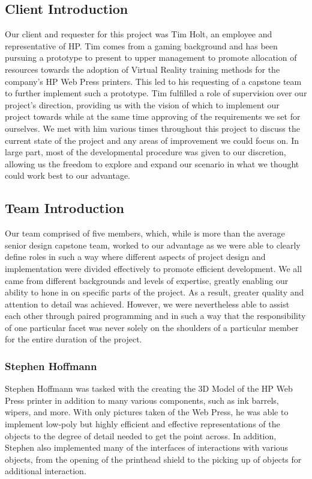 \documentclass[onecolumn, draftclsnofoot,10pt, compsoc]{IEEEtran}
\begin{document}
\subsection{Client Introduction}
Our client and requester for this project was Tim Holt, an employee and representative of HP. Tim comes from a gaming background and has been pursuing a prototype to present to upper management to promote allocation of resources towards the adoption of Virtual Reality training methods for the company's HP Web Press printers. This led to his requesting of a capstone team to further implement such a prototype. Tim fulfilled a role of supervision over our project's direction, providing us with the vision of which to implement our project towards while at the same time approving of the requirements we set for ourselves. We met with him various times throughout this project to discuss the current state of the project and any areas of improvement we could focus on. In large part, most of the developmental procedure was given to our discretion, allowing us the freedom to explore and expand our scenario in what we thought could work best to our advantage. 

\subsection{Team Introduction}
Our team comprised of five members, which, while is more than the average senior design capstone team, worked to our advantage as we were able to clearly define roles in such a way where different aspects of project design and implementation were divided effectively to promote efficient development. We all came from different backgrounds and levels of expertise, greatly enabling our ability to hone in on specific parts of the project. As a result, greater quality and attention to detail was achieved. However, we were nevertheless able to assist each other through paired programming and in such a way that the responsibility of one particular facet was never solely on the shoulders of a particular member for the entire duration of the project.

\subsubsection{Stephen Hoffmann}
Stephen Hoffmann was tasked with the creating the 3D Model of the HP Web Press printer in addition to many various components, such as ink barrels, wipers, and more. With only pictures taken of the Web Press, he was able to implement low-poly but highly efficient and effective representations of the objects to the degree of detail needed to get the point across. In addition, Stephen also implemented many of the interfaces of interactions with various objects, from the opening of the printhead shield to the picking up of objects for additional interaction. 
\end{document}
